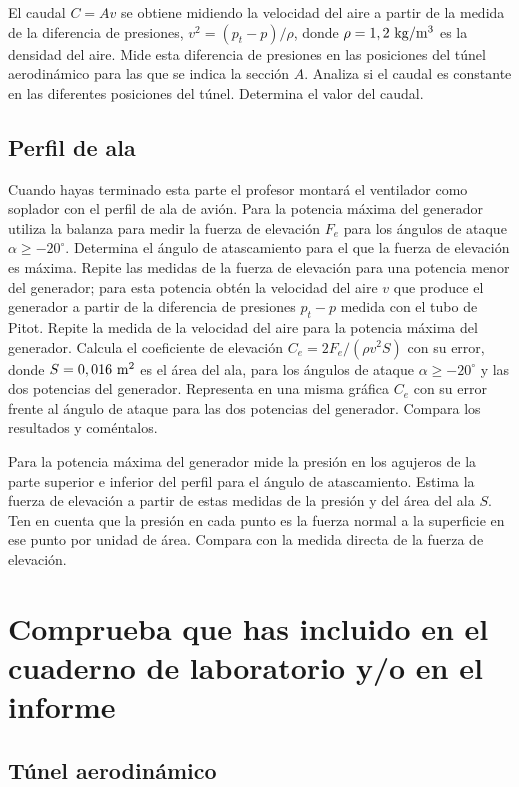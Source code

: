 \documentclass[11pt]{articulo}
\begin{document}
El caudal $C = Av$ se obtiene midiendo la velocidad del aire a partir de la medida de la diferencia de presiones, $v^2 = (p_t - p)/ \rho$, donde $\rho = 1,2~{\rm kg/m^3}$ es la densidad del aire. Mide esta diferencia de presiones en las posiciones del t\'unel aerodin\'amico para las que se indica la secci\'on $A$. Analiza si el caudal es constante en las diferentes posiciones del t\'unel. Determina el valor del caudal.

\subsection{Perfil de ala}

Cuando hayas terminado esta parte el profesor montar\'a el ventilador como soplador con el perfil de ala de avi\'on. Para la potencia m\'axima del generador utiliza la balanza para medir la fuerza de elevaci\'on $F_e$ para los \'angulos de ataque $\alpha \ge -20^{\circ}$. Determina el \'angulo de atascamiento para el que la fuerza de elevaci\'on es m\'axima. Repite las medidas de la fuerza de elevaci\'on para una potencia menor del generador; para esta potencia obt\'en la velocidad del aire $v$ que produce el generador a partir de la diferencia de presiones $p_t - p$ medida con el tubo de Pitot. Repite la medida de la velocidad del aire para la potencia m\'axima del generador. Calcula el coeficiente de elevaci\'on $C_e = 2 F_e / (\rho v^2 S)$ con su error, donde $S = 0,016~{\rm m^2}$ es el \'area del ala, para los \'angulos de ataque $\alpha \geq -20^{\circ}$ y las dos potencias del generador. Representa en una misma gr\'afica $C_e$ con su error frente al \'angulo de ataque para las dos potencias del generador. Compara los resultados y com\'entalos.

Para la potencia m\'axima del generador mide la presi\'on en los agujeros de la parte superior e inferior del perfil para el \'angulo de atascamiento. Estima la fuerza de elevaci\'on a partir de estas medidas de la presi\'on y del \'area del ala $S$. Ten en cuenta que la presi\'on en cada punto es la fuerza normal a la superficie en ese punto por unidad de \'area. Compara con la medida directa de la fuerza de elevaci\'on.


\section{Comprueba que has incluido en el cuaderno de laboratorio y/o en el informe}

\subsection*{T\'unel aerodin\'amico}
\end{document}
